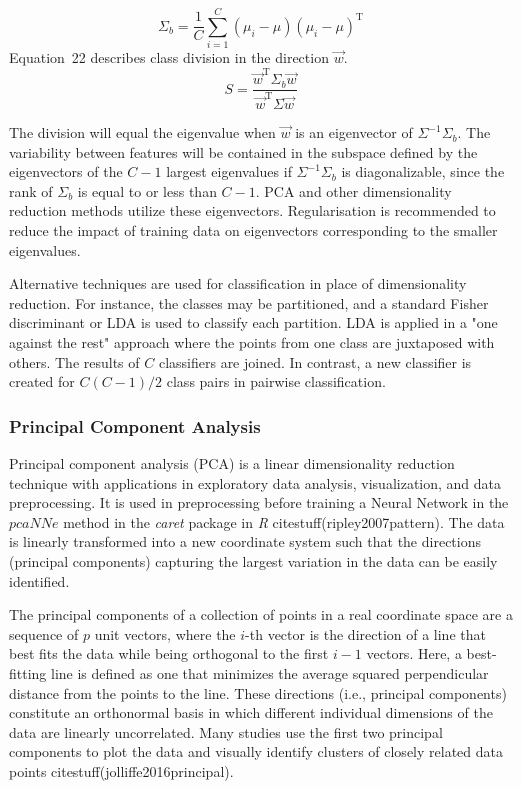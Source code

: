 \documentclass[preprint,12pt]{elsarticle}
\begin{document}
\begin{equation}
	\Sigma_{b}={\frac{1}{C}}\sum_{i=1}^{C}\left(\mu_{i}-\mu\right)\left(\mu_{i}-\mu\right)^{\mathrm{T}}
	\label{eqn:21}
\end{equation}
Equation~22 describes class division in the direction $\vec{w}$.
\begin{equation}
	S={\frac{{\vec{w}}^{\mathrm{T}}\Sigma_{b}{\vec{w}}}{{\vec{w}}^{\mathrm{T}}\Sigma {\vec{w}}}}
	\label{eqn:22}
\end{equation}

The division will equal the eigenvalue when $\vec{w}$ is an eigenvector of $\Sigma ^{-1}\Sigma_{b}$. The variability between features will be contained in the subspace defined by the eigenvectors of the $C - 1$ largest eigenvalues if $\Sigma ^{-1}\Sigma_{b}$ is diagonalizable, since the rank of $\Sigma_{b}$ is equal to or less than $C - 1$. PCA and other dimensionality reduction methods utilize these eigenvectors. Regularisation is recommended to reduce the impact of training data on eigenvectors corresponding to the smaller eigenvalues.

Alternative techniques are used for classification in place of dimensionality reduction. For instance, the classes may be partitioned, and a standard Fisher discriminant or LDA is used to classify each partition. LDA is applied in a "one against the rest" approach where the points from one class are juxtaposed with others. The results of $C$ classifiers are joined. In contrast, a new classifier is created for $ C(C - 1)/2$ class pairs in pairwise classification.

\subsubsection{Principal Component Analysis}

Principal component analysis (PCA) is a linear dimensionality reduction technique with applications in exploratory data analysis, visualization, and data preprocessing. It is used in preprocessing before training a Neural Network in the $pcaNNe$ method in the \textit{caret} package in \textit{R} citestuff(ripley2007pattern). The data is linearly transformed into a new coordinate system such that the directions (principal components) capturing the largest variation in the data can be easily identified.

The principal components of a collection of points in a real coordinate space are a sequence of $p$ unit vectors, where the $i$-th vector is the direction of a line that best fits the data while being orthogonal to the first $i-1$ vectors. Here, a best-fitting line is defined as one that minimizes the average squared perpendicular distance from the points to the line. These directions (i.e., principal components) constitute an orthonormal basis in which different individual dimensions of the data are linearly uncorrelated. Many studies use the first two principal components to plot the data and visually identify clusters of closely related data points citestuff(jolliffe2016principal).
\end{document}
